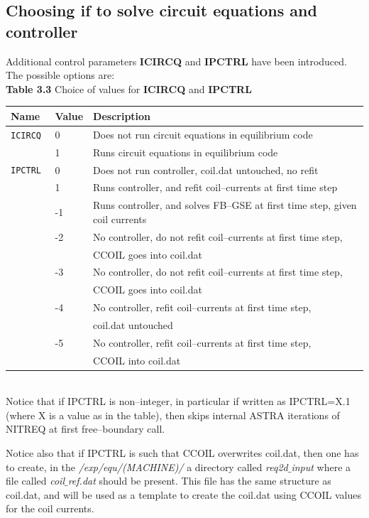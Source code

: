 \subsection{Choosing if to solve circuit equations and controller}
Additional control parameters {\bf ICIRCQ} and {\bf IPCTRL} have been introduced. The possible options are:
\\
{\bf Table 3.3} Choice of values for {\bf ICIRCQ} and {\bf IPCTRL}\\[2ex]
\begin{tabular}{|l|l|l|}					\hline
\bf Name	&\bf Value & Description\\ \hline
\tt ICIRCQ 	& 0 & Does not run circuit equations in equilibrium code \\
\tt  	& 1 &  Runs circuit equations in equilibrium code\\ 
\tt IPCTRL 	& 0 & Does not run controller, coil.dat untouched, no refit \\
\tt  	& 1 &  Runs controller, and refit coil--currents at first time step\\ 
\tt  	& -1 &  Runs controller, and solves FB--GSE at first time step, given coil currents\\ 
\tt  	& -2 &  No controller, do not refit coil--currents at first time step, \\
\tt  	&  &  CCOIL goes into coil.dat\\ 
\tt  	& -3 &  No controller, do not refit coil--currents at first time step,\\
\tt  	&  &   CCOIL goes into coil.dat\\ 
\tt  	& -4 &  No controller, refit coil--currents at first time step,\\
\tt  	&  &   coil.dat untouched\\ 
\tt  	& -5 &  No controller, refit coil--currents at first time step,\\
\tt  	&  &   CCOIL into coil.dat\\ 
\hline
\end{tabular}
\bigskip\\
Notice that if IPCTRL is non--integer, in particular if written as IPCTRL=X.1 (where X is a value as in the table), then
skips internal ASTRA iterations of NITREQ at first free--boundary call.

Notice also that if IPCTRL is such that CCOIL overwrites coil.dat, then one has to create, in the
{\it /exp/equ/(MACHINE)/} a directory called {\it req2d$\_$input} where a file called
{\it coil$\_$ref.dat} should be present. This file has the same structure as coil.dat, and will be used as a template 
to create the coil.dat using CCOIL values for the coil currents.
%
